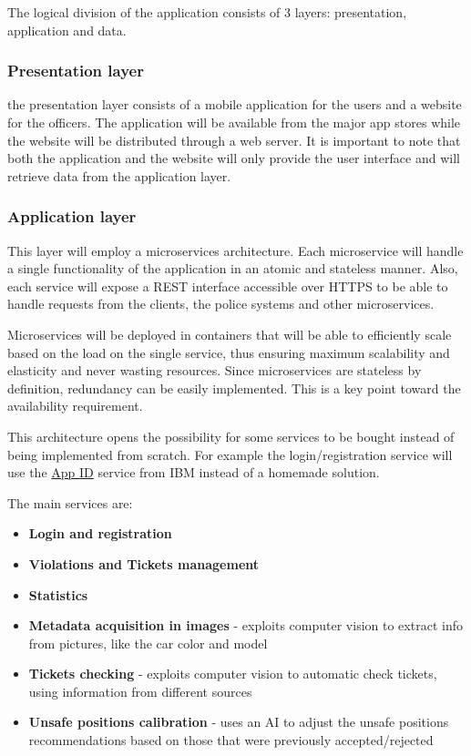 The logical division of the application consists of 3 layers: presentation, application and data.

\subsubsection{Presentation layer}
the presentation layer consists of a mobile application for the users and a website for the officers.
The application will be available from the major app stores while the website will be distributed through a web server.
It is important to note that both the application and the website will only provide the user interface and will retrieve data from the application layer.

\subsubsection{Application layer}
This layer will employ a microservices architecture.
Each microservice will handle a single functionality of the application in an atomic and stateless manner.
Also, each service will expose a REST interface accessible over HTTPS to be able to handle requests from the clients, the police systems and other microservices.

Microservices will be deployed in containers that will be able to efficiently scale based on the load on the single service, thus ensuring maximum scalability and elasticity and never wasting resources.
Since microservices are stateless by definition, redundancy can be easily implemented. This is a key point toward the availability requirement.

This architecture opens the possibility for some services to be bought instead of being implemented from scratch. For example the login/registration service will use the \href{https://cloud.ibm.com/catalog/services/app-id#about}{App ID} service from IBM instead of a homemade solution.

The main services are:
\begin{itemize}
    \item \textbf{Login and registration}
    \item \textbf{Violations and Tickets management}
    \item \textbf{Statistics}
    \item \textbf{Metadata acquisition in images} - exploits computer vision to extract info from pictures, like the car color and model
    \item \textbf{Tickets checking} - exploits computer vision to automatic check tickets, using information from different sources
    \item \textbf{Unsafe positions calibration} - uses an AI to adjust the unsafe positions recommendations based on those that were previously accepted/rejected
\end{itemize}

